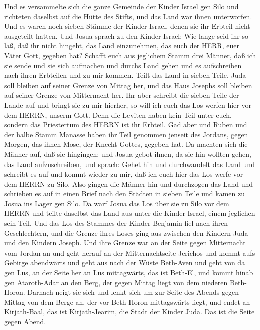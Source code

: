  Und es versammelte sich die ganze Gemeinde der Kinder
Israel gen Silo und richteten daselbst auf die Hütte des Stifts, und das
Land war ihnen unterworfen.  Und es waren noch sieben Stämme
der Kinder Israel, denen sie ihr Erbteil nicht ausgeteilt hatten.
 Und Josua sprach zu den Kinder Israel: Wie lange seid ihr
so laß, daß ihr nicht hingeht, das Land einzunehmen, das euch der HERR,
euer Väter Gott, gegeben hat?  Schafft euch aus jeglichem
Stamm drei Männer, daß ich sie sende und sie sich aufmachen und durchs
Land gehen und es aufschreiben nach ihren Erbteilen und zu mir kommen.
 Teilt das Land in sieben Teile. Juda soll bleiben auf
seiner Grenze von Mittag her, und das Haus Josephs soll bleiben auf
seiner Grenze von Mitternacht her.  Ihr aber schreibt die
sieben Teile der Lande auf und bringt sie zu mir hierher, so will ich
euch das Los werfen hier vor dem HERRN, unserm Gott.  Denn
die Leviten haben kein Teil unter euch, sondern das Priestertum des
HERRN ist ihr Erbteil. Gad aber und Ruben und der halbe Stamm Manasse
haben ihr Teil genommen jenseit des Jordans, gegen Morgen, das ihnen
Mose, der Knecht Gottes, gegeben hat.  Da machten sich die
Männer auf, daß sie hingingen; und Josua gebot ihnen, da sie hin wollten
gehen, das Land aufzuschreiben, und sprach: Gehet hin und durchwandelt
das Land und schreibt es auf und kommt wieder zu mir, daß ich euch hier
das Los werfe vor dem HERRN zu Silo.  Also gingen die Männer
hin und durchzogen das Land und schrieben es auf in einen Brief nach den
Städten in sieben Teile und kamen zu Josua ins Lager gen Silo.
 Da warf Josua das Los über sie zu Silo vor dem HERRN und
teilte daselbst das Land aus unter die Kinder Israel, einem jeglichen
sein Teil.  Und das Los des Stammes der Kinder Benjamin
fiel nach ihren Geschlechtern, und die Grenze ihres Loses ging aus
zwischen den Kindern Juda und den Kindern Joseph.  Und ihre
Grenze war an der Seite gegen Mitternacht vom Jordan an und geht herauf
an der Mitternachtseite Jerichos und kommt aufs Gebirge abendwärts und
geht aus nach der Wüste Beth-Aven  und geht von da gen Lus,
an der Seite her an Lus mittagwärts, das ist Beth-El, und kommt hinab
gen Ataroth-Adar an den Berg, der gegen Mittag liegt von dem niederen
Beth-Horon.  Darnach neigt sie sich und lenkt sich um zur
Seite des Abends gegen Mittag von dem Berge an, der vor Beth-Horon
mittagswärts liegt, und endet an Kirjath-Baal, das ist Kirjath-Jearim,
die Stadt der Kinder Juda. Das ist die Seite gegen Abend. 
